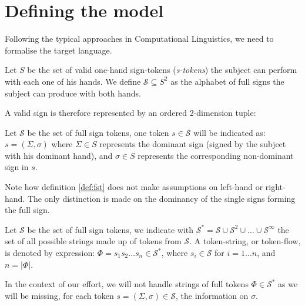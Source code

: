 
\section{Defining the model}
\label{sec:model}

Following the typical approaches in Computational Linguistics, we need to formalise the target language.

\begin{definition}[Alphabet]
Let $S$ be the set of valid one-hand sign-tokens (\textit{s-tokens}) the subject can perform with each 
one of his hands. We define $\mathcal{S} \subseteq S^2$ as the alphabet of full signs the subject can
produce with both hands.
\end{definition}

A valid sign is therefore represented by an ordered 2-dimension tuple:

\begin{definition} \label{def:fst}
Let $\mathcal{S}$ be the set of full sign tokens, one token $s \in \mathcal{S}$ will be indicated as:
$s = (\Sigma, \sigma)$ where $\Sigma \in S$ represents the dominant sign (signed by the subject with his
dominant hand), and $\sigma \in S$ represents the corresponding non-dominant sign in $s$.
\end{definition}

Note how definition \ref{def:fst} does not make assumptions on left-hand or right-hand. The only distinction
is made on the dominancy of the single signs forming the full sign.

\begin{definition}
Let $\mathcal{S}$ be the set of full sign tokens, we indicate with 
$\mathcal{S}^\ast = \mathcal{S} \cup \mathcal{S}^2 \cup \dots \cup \mathcal{S}^\infty$ the set of all possible
strings made up of tokens from $\mathcal{S}$. A token-string, or token-flow, is denoted by expression:
$\Phi = s_1 s_2 \dots s_n \in \mathcal{S}^\ast$, where $s_i \in \mathcal{S}$ for $i = 1 \dots n$, and 
$n = |\Phi|$.
\end{definition}

In the context of our effort, we will not handle strings of full tokens $\Phi \in \mathcal{S}^\ast$ as we will
be missing, for each token $s = (\Sigma, \sigma) \in \mathcal{S}$, the information on $\sigma$.
